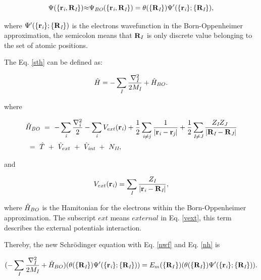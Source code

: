 \documentclass[a4paper, 12pt, titlepage,oneside,drop]{kthesis}
\begin{document}
\begin{equation}\label{nwf}
{\Psi(\{ {\textbf r}_{\textit i}, {\textbf R}_{\textit I} \})}  {\approx}  {\Psi_{ \textit{BO}} ( \{ {\textbf{r}_{\textit{i}}},\textbf{R}_{\textit I} \}) } = {\theta(\{{\textbf R}_{\textit I}\})} {\Psi'(\{\textbf{r}_{\textit i}\}; \{{\textbf R}_{\textit I}\})},
\end{equation}

where ${\Psi'(\{\textbf{r}_{\textit i}\}; \{{\textbf R}_{\textit I}\})}$  is the electrons wavefunction in the Born-Oppenheimer approximation, the semicolon means that $\textbf R_I$ is only discrete value belonging to the set of atomic positions. 
 
The Eq. \ref{sth} can be defined as:

\begin{equation}\label{nh}
 {\hath} = - \sumi<I> \frac{{{\nabla}_{\textit{I}}^{2}}}{2 M_\textit{I}} + {\hath}_{BO}.
\end{equation}

where 

\begin{equation}\label{both}\begin{split}
&{\hath}_\textit{BO}\ =\ - \sumi<i>   \frac{{{\nabla}_{\textit{i}}^{2}}}{2}  - \sumi<i> V_{ext}(\textbf{r}_{\textit{i}})  + \frac{1}{2} \suminj<i><j> \frac{1}{ |\textbf{r}_\textit{i}-\textbf{r}_\textit{j}|} + \frac{1}{2} \suminj<I><J> \frac{Z_\textit{I} Z_\textit{J}\ }{|\textbf{R}_\textit{I}-\textbf{R}_\textit{J}|} \\
&\ = \ \hat{T} \ + \ \hat{V}_{ext} \ + \ \hat{V}_\textit{int}\ + \ N_\textit{II},
\end{split}\end{equation}

and

\begin{equation}\label{vext}
V_{ext}(\textbf{r}_{\textit{i}}) =  \sumi<I> \frac{Z_\textit{I}}{|\textbf{r}_\textit{i}-\textbf{R}_\textit{I}|},
\end{equation}

where ${\hat{H}}_\textit{BO}$  is the Hamitonian for the electrons within the Born-Oppenheimer approximation. The subscript $ext$ means $external$ in Eq. \ref{vext}, this term describes the external potentials interaction. 

Thereby, the new Schrödinger equation with Eq. \ref{nwf} and Eq. \ref{nh} is 

\begin{equation}
 (- \sumi<I> \frac{{{\nabla}_{\textit{I}}^{2}}}{2 M_\textit{I}} + {\hath}_{BO} ) ({\theta(\{{\textbf R}_{\textit I}\})} {\Psi'(\{\textbf{r}_{\textit i}\}; \{{\textbf R}_{\textit I}\})}) = E_{m}(\{{\textbf R_I}\}) ({\theta(\{{\textbf R}_{\textit I}\})} {\Psi'(\{\textbf{r}_{\textit i}\}; \{{\textbf R}_{\textit I}\})}).
\end{equation}
 
\end{document}
